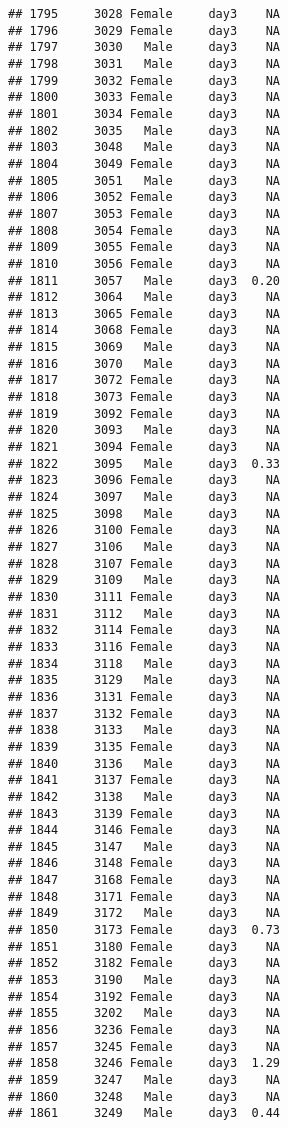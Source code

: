 \documentclass[
]{article}
\begin{document}
\begin{verbatim}
## 1795     3028 Female     day3    NA
## 1796     3029 Female     day3    NA
## 1797     3030   Male     day3    NA
## 1798     3031   Male     day3    NA
## 1799     3032 Female     day3    NA
## 1800     3033 Female     day3    NA
## 1801     3034 Female     day3    NA
## 1802     3035   Male     day3    NA
## 1803     3048   Male     day3    NA
## 1804     3049 Female     day3    NA
## 1805     3051   Male     day3    NA
## 1806     3052 Female     day3    NA
## 1807     3053 Female     day3    NA
## 1808     3054 Female     day3    NA
## 1809     3055 Female     day3    NA
## 1810     3056 Female     day3    NA
## 1811     3057   Male     day3  0.20
## 1812     3064   Male     day3    NA
## 1813     3065 Female     day3    NA
## 1814     3068 Female     day3    NA
## 1815     3069   Male     day3    NA
## 1816     3070   Male     day3    NA
## 1817     3072 Female     day3    NA
## 1818     3073 Female     day3    NA
## 1819     3092 Female     day3    NA
## 1820     3093   Male     day3    NA
## 1821     3094 Female     day3    NA
## 1822     3095   Male     day3  0.33
## 1823     3096 Female     day3    NA
## 1824     3097   Male     day3    NA
## 1825     3098   Male     day3    NA
## 1826     3100 Female     day3    NA
## 1827     3106   Male     day3    NA
## 1828     3107 Female     day3    NA
## 1829     3109   Male     day3    NA
## 1830     3111 Female     day3    NA
## 1831     3112   Male     day3    NA
## 1832     3114 Female     day3    NA
## 1833     3116 Female     day3    NA
## 1834     3118   Male     day3    NA
## 1835     3129   Male     day3    NA
## 1836     3131 Female     day3    NA
## 1837     3132 Female     day3    NA
## 1838     3133   Male     day3    NA
## 1839     3135 Female     day3    NA
## 1840     3136   Male     day3    NA
## 1841     3137 Female     day3    NA
## 1842     3138   Male     day3    NA
## 1843     3139 Female     day3    NA
## 1844     3146 Female     day3    NA
## 1845     3147   Male     day3    NA
## 1846     3148 Female     day3    NA
## 1847     3168 Female     day3    NA
## 1848     3171 Female     day3    NA
## 1849     3172   Male     day3    NA
## 1850     3173 Female     day3  0.73
## 1851     3180 Female     day3    NA
## 1852     3182 Female     day3    NA
## 1853     3190   Male     day3    NA
## 1854     3192 Female     day3    NA
## 1855     3202   Male     day3    NA
## 1856     3236 Female     day3    NA
## 1857     3245 Female     day3    NA
## 1858     3246 Female     day3  1.29
## 1859     3247   Male     day3    NA
## 1860     3248   Male     day3    NA
## 1861     3249   Male     day3  0.44

\end{verbatim}
\end{document}
